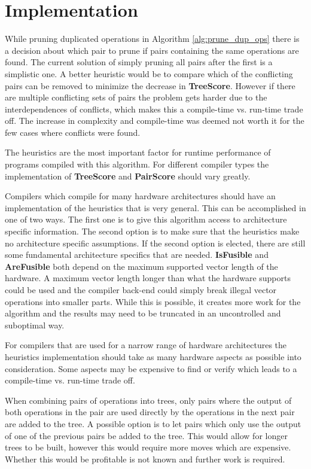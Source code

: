 \documentclass[12pt,a4paper,onecolumn,twoside,openright]{report}
\begin{document}
\section{Implementation}
While pruning duplicated operations in Algorithm \ref{alg:prune_dup_ops} there is a decision about which pair to prune if pairs containing the same operations are found. The current solution of simply pruning all pairs after the first is a simplistic one. A better heuristic would be to compare which of the conflicting pairs can be removed to minimize the decrease in \textbf{TreeScore}. However if there are multiple conflicting sets of pairs the problem gets harder due to the interdependences of conflicts, which makes this a compile-time vs. run-time trade off. The increase in complexity and compile-time was deemed not worth it for the few cases where conflicts were found.


The heuristics are the most important factor for runtime performance of programs compiled with this algorithm. For different compiler types the implementation of \textbf{TreeScore} and \textbf{PairScore} should vary greatly. 

Compilers which compile for many hardware architectures should have an implementation of the heuristics that is very general. This can be accomplished in one of two ways. The first one is to give this algorithm access to architecture specific information. The second option is to make sure that the heuristics make no architecture specific assumptions. If the second option is elected, there are still some fundamental architecture specifics that are needed. \textbf{IsFusible} and \textbf{AreFusible} both depend on the maximum supported vector length of the hardware. A maximum vector length longer than what the hardware supports could be used and the compiler back-end could simply break illegal vector operations into smaller parts. While this is possible, it creates more work for the algorithm and the results may need to be truncated in an uncontrolled and suboptimal way.

For compilers that are used for a narrow range of hardware architectures the heuristics implementation should take as many hardware aspects as possible into consideration. Some aspects may be expensive to find or verify which leads to a compile-time vs. run-time trade off.

When combining pairs of operations into trees, only pairs where the output of both operations in the pair are used directly by the operations in the next pair are added to the tree. A possible option is to let pairs which only use the output of one of the previous pairs be added to the tree. This would allow for longer trees to be built, however this would require more moves which are expensive. Whether this would be profitable is not known and further work is required.
\end{document}
